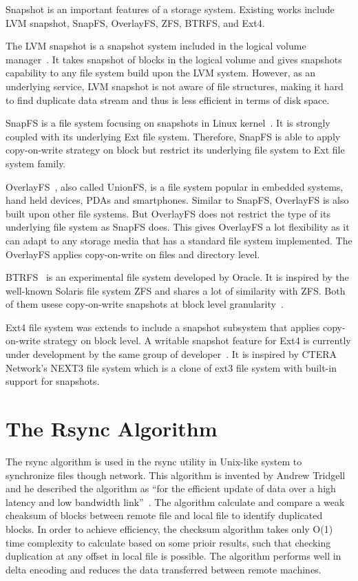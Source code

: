     Snapshot is an important features of a storage system. Existing works include LVM snapshot, SnapFS, OverlayFS, ZFS, BTRFS, and Ext4.
    
    The LVM snapshot is a snapshot system included in the logical volume manager~\cite{lvm, disk_perform_lvm}. It takes snapshot of blocks in the logical volume and gives snapshots capability to any file system build upon the LVM system. However, as an underlying service, LVM snapshot is not aware of file structures, making it hard to find duplicate data stream and thus is less efficient in terms of disk space.
    
    SnapFS is a file system focusing on snapshots in Linux kernel~\cite{snapfs}. It is strongly coupled with its underlying Ext file system. Therefore, SnapFS is able to apply copy-on-write strategy on block but restrict its underlying file system to Ext file system family. 
    
    OverlayFS~\cite{overlayfs}, also called UnionFS, is a file system popular in embedded systems, hand held devices, PDAs and smartphones. Similar to SnapFS, OverlayFS is also built upon other file systems. But OverlayFS does not restrict the type of its underlying file system as SnapFS does. This gives OverlayFS a lot flexibility as it can adapt to any storage media that has a standard file system implemented. The OverlayFS applies copy-on-write on files and directory level.

    BTRFS~\cite{btrfs} is an experimental file system developed by Oracle. It is inspired by the well-known Solaris file system ZFS and shares a lot of similarity with ZFS. Both of them usese copy-on-write snapshots at block level granularity~\cite{btrfscow}.
    
    Ext4 file system was extends to include a snapshot subsystem that applies copy-on-write strategy on block level. A writable snapshot feature for Ext4 is currently under development by the same group of developer~\cite{ext4snap}. It is inspired by CTERA Network's NEXT3 file system which is a clone of ext3 file system with built-in support for snapshots.

\section{The Rsync Algorithm}
    
    The rsync algorithm is used in the rsync utility in Unix-like system to synchronize files though network. This algorithm is invented by Andrew Tridgell and he described the algorithm as ``for the efficient update of data over a high latency and low bandwidth link''~\cite{rsync_alg}. The algorithm calculate and compare a weak cheaksum of blocks between remote file and local file to identify duplicated blocks. In order to achieve efficiency, the checksum algorithm takes only O(1) time complexity to calculate based on some prioir results, such that checking duplication at any offset in local file is possible. The algorithm performs well in delta encoding and reduces the data transferred between remote machines.

